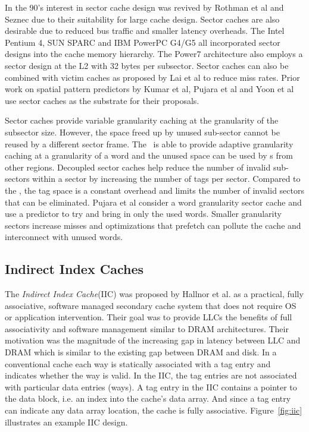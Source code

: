 In the 90's interest in sector cache design was revived by Rothman et al\cite{Rothman_Smith_2000} and Seznec\cite{Seznec-decoupled-sector-cache-isca, seznec:inria-00074588} due to their suitability for large cache design. Sector caches are also desirable due to reduced bus traffic and smaller latency overheads.  The Intel Pentium 4, SUN SPARC and IBM PowerPC G4/G5 all incorporated sector designs into the cache memory hierarchy. The Power7 architecture also employs a sector design at the L2 with 32 bytes per subsector. Sector caches can also be combined with victim caches as proposed by Lai et al\cite{Lai-victim-sector} to reduce miss rates. Prior work on spatial pattern predictors by Kumar et al\cite{kumar-isca-1998}, Pujara et al\cite{pujara-hpca-2006} and Yoon et al\cite{Yoon_Jeong_Erez_2011, yoon2012dgms} use sector caches as the substrate for their proposals.

Sector caches provide variable granularity caching at the granularity of the subsector size. However, the space freed up by unused sub-sector cannot be reused by a different sector frame. The \AC\ is able to provide adaptive granularity caching at a granularity of a word and the unused space can be used by \AB{}s from other regions. Decoupled sector caches\cite{Seznec-decoupled-sector-cache-isca} help reduce the number of invalid sub-sectors within a sector by increasing the number of tags per sector. Compared to the \AC{}, the tag space is a constant overhead and limits the number of invalid sectors that can be eliminated. Pujara et al\cite{pujara-hpca-2006} consider a word granularity sector cache and use a predictor to try and bring in only the used words. Smaller granularity sectors increase misses and optimizations that prefetch can pollute the cache and interconnect with unused words.

\subsection{Indirect Index Caches}
\label{sec:indirect_index_caches}
The \textit{Indirect Index Cache}(IIC) was proposed by Hallnor et al.\cite{Hallnor_Reinhardt_2000} as a practical, fully associative, software managed secondary cache system that does not require OS or application intervention. Their goal was to provide LLCs the benefits of full associativity and software management similar to DRAM architectures. Their motivation was the magnitude of the increasing gap in latency between LLC and DRAM which is similar to the existing gap between DRAM and disk. In a conventional cache each way is statically associated with a tag entry and indicates whether the way is valid. In the IIC, the tag entries are not associated with particular data entries (ways). A tag entry in the IIC contains a pointer to the data block, i.e. an index into the cache's data array. And since a tag entry can indicate any data array location, the cache is fully associative. Figure~\ref{fig:iic} illustrates an example IIC design. 


